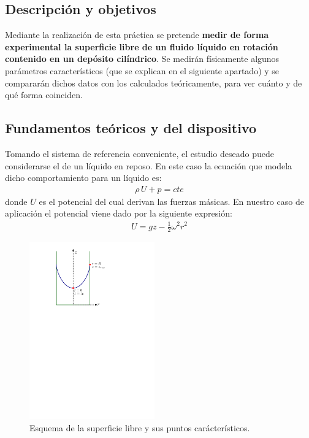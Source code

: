 \documentclass[12pt,a4paper]{article}
\begin{document}
\subsection*{Descripción y objetivos}
Mediante la realización de esta práctica se pretende \textbf{medir de forma experimental la superficie libre de un fluido líquido en rotación contenido en un depósito cilíndrico}. Se medirán físicamente algunos parámetros característicos (que se explican en el siguiente apartado) y se compararán dichos datos con los calculados teóricamente, para ver cuánto y de qué forma coinciden.

\subsection*{Fundamentos teóricos y del dispositivo}
Tomando el sistema de referencia conveniente, el estudio deseado puede considerarse el de un líquido en reposo. En este caso la ecuación que modela dicho comportamiento para un líquido es:
\begin{align*}
\rho\, U+p=cte
\end{align*}
donde $U$ es el potencial del cual derivan las fuerzas másicas. En nuestro caso de aplicación el potencial viene dado por la siguiente expresión:
\begin{align}
U=gz-\frac{1}{2}\omega^2 r^2
\label{eq1}
\end{align}

\begin{figure}
\vspace{-0.5cm}
 	 \begin{center}
  \includegraphics[width=0.48\textwidth]{fotos/esquema_3}
  	 \end{center}
  	 \vspace{-0.5cm}
  	\caption{Esquema de la superficie libre y sus puntos carácterísticos.}
  	\label{fig6}
  	\vspace{-0.5cm}
\end{figure}
\end{document}
